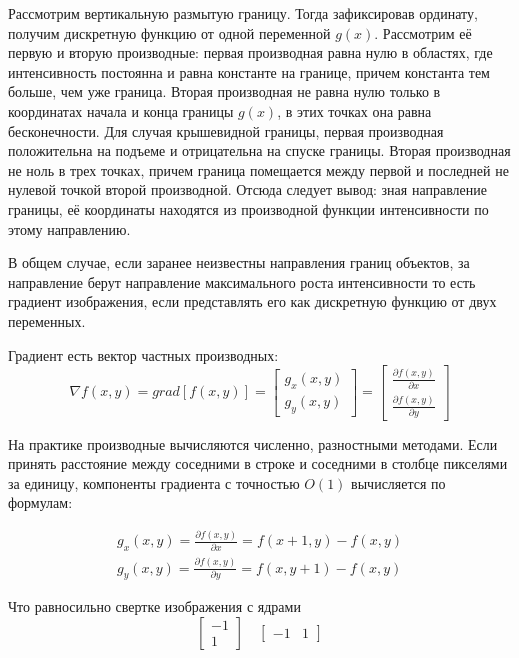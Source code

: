 \documentclass[oneside,final,14pt]{extreport}
\begin{document}
Рассмотрим вертикальную размытую границу. Тогда зафиксировав ординату, получим дискретную функцию от одной переменной $g(x)$. Рассмотрим её первую и вторую производные: первая производная равна нулю в областях, где интенсивность постоянна и равна константе на границе, причем константа тем больше, чем уже граница. Вторая производная не равна нулю только в координатах начала и конца границы $g(x)$, в этих точках она равна бесконечности. Для случая крышевидной границы, первая производная положительна на подъеме и отрицательна на спуске границы. Вторая производная не ноль в трех точках, причем граница помещается между первой и последней не нулевой точкой второй производной. Отсюда следует вывод: зная направление границы, её координаты находятся из производной функции интенсивности по этому направлению. 
 
В общем случае, если заранее неизвестны направления границ объектов, за направление берут направление максимального роста интенсивности  то есть градиент изображения, если представлять его как дискретную функцию от двух переменных. 

Градиент есть вектор частных производных:
\begin{equation}
\nabla f(x,y) 
= 
grad[f(x,y)]
=
\begin{bmatrix}
g_x(x,y)\\
g_y(x,y)
\end{bmatrix}
=
\begin{bmatrix}
\frac{\partial f(x,y)}
{\partial x}\\
\frac{\partial f(x,y)}
{\partial y}
\end{bmatrix}
\end{equation}

 На практике производные вычисляются численно, разностными методами. Если принять расстояние между соседними в строке и соседними в столбце пикселями за единицу, компоненты градиента с точностью $O(1)$ вычисляется по формулам:

\begin{gather}
g_x(x,y) 
= 
\frac{\partial f(x,y)}
{\partial x}
=
f(x+1,y) - f(x,y)
\\
g_y(x,y) 
= 
\frac{\partial f(x,y)}
{\partial y}
=
f(x,y+1) - f(x,y)
\end{gather}

Что равносильно свертке изображения \cite{Dup:coursache} с ядрами 
\begin{equation}
\begin{bmatrix}
-1\\1
\end{bmatrix}
\quad
\begin{bmatrix}
-1 & 1
\end{bmatrix}
\end{equation}
\end{document}

